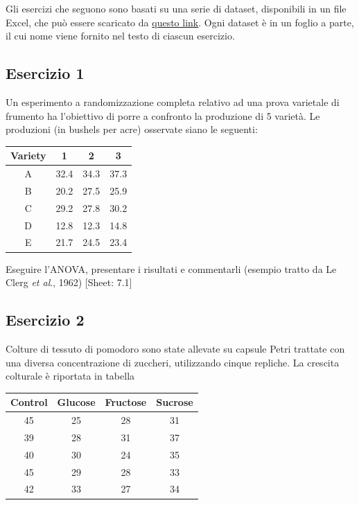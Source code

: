 \documentclass[a4paper,12pt,oneside]{book}
\begin{document}
Gli esercizi che seguono sono basati su una serie di dataset, disponibili in un file Excel, che può essere scaricato da \href{https://www.casaonofri.it/_datasets/EserciziTesto.xlsx}{questo link}. Ogni dataset è in un foglio a parte, il cui nome viene fornito nel testo di ciascun esercizio.

\hypertarget{esercizio-1-5}{%
\subsection{Esercizio 1}\label{esercizio-1-5}}

Un esperimento a randomizzazione completa relativo ad una prova varietale di frumento ha l'obiettivo di porre a confronto la produzione di 5 varietà. Le produzioni (in bushels per acre) osservate siano le seguenti:

\begin{longtable}[]{@{}cccc@{}}
\toprule
Variety & 1 & 2 & 3 \\
\midrule
\endhead
A & 32.4 & 34.3 & 37.3 \\
B & 20.2 & 27.5 & 25.9 \\
C & 29.2 & 27.8 & 30.2 \\
D & 12.8 & 12.3 & 14.8 \\
E & 21.7 & 24.5 & 23.4 \\
\bottomrule
\end{longtable}

Eseguire l'ANOVA, presentare i risultati e commentarli (esempio tratto da Le Clerg \emph{et al}., 1962)
{[}Sheet: 7.1{]}

\hypertarget{esercizio-2-5}{%
\subsection{Esercizio 2}\label{esercizio-2-5}}

Colture di tessuto di pomodoro sono state allevate su capsule Petri trattate con una diversa concentrazione di zuccheri, utilizzando cinque repliche. La crescita colturale è riportata in tabella

\begin{longtable}[]{@{}cccc@{}}
\toprule
Control & Glucose & Fructose & Sucrose \\
\midrule
\endhead
45 & 25 & 28 & 31 \\
39 & 28 & 31 & 37 \\
40 & 30 & 24 & 35 \\
45 & 29 & 28 & 33 \\
42 & 33 & 27 & 34 \\
\bottomrule
\end{longtable}
\end{document}
